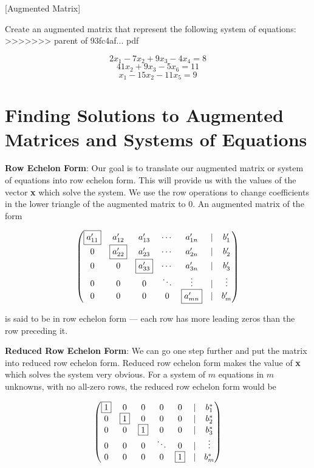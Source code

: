 \documentclass[]{book}
\theoremstyle{definition}
\theoremstyle{definition}
\theoremstyle{definition}
\theoremstyle{remark}
\begin{document}
[Augmented Matrix]
\protect\hypertarget{exr:augmatrix}{}{\label{exr:augmatrix} {} }

Create an augmented matrix that represent the following system of equations:
>>>>>>> parent of 93fc4af... pdf

\[2x_1 -7x_2 + 9x_3 -4x_4 = 8\]
\[41x_2 + 9x_3 -5x_6 = 11\]
\[x_1 -15x_2 -11x_5 = 9\]

\hypertarget{finding-solutions-to-augmented-matrices-and-systems-of-equations}{%
\section{Finding Solutions to Augmented Matrices and Systems of Equations}\label{finding-solutions-to-augmented-matrices-and-systems-of-equations}}

\textbf{Row Echelon Form}: Our goal is to translate our augmented matrix or system of equations into row echelon form. This will provide us with the values of the vector \textbf{x} which solve the system. We use the row operations to change coefficients in the lower triangle of the augmented matrix to 0. An augmented matrix of the form

\[\begin{pmatrix}
            \fbox{$a'_{11}$}& a'_{12} & a'_{13}& \cdots & a'_{1n} & | & b'_1\\
            0 & \fbox{$a'_{22}$} & a'_{23}& \cdots & a'_{2n} & | & b'_2\\
            0 & 0 & \fbox{$a'_{33}$}& \cdots & a'_{3n} & | & b'_3\\
            0 & 0 &0 & \ddots & \vdots  & | & \vdots \\
            0 & 0 &0 &0 & \fbox{$a'_{mn}$} & | & b'_m
            \end{pmatrix}\]

is said to be in row echelon form --- each row has more leading zeros than the row preceding it.

\textbf{Reduced Row Echelon Form}: We can go one step further and put the matrix into reduced row echelon form. Reduced row echelon form makes the value of \textbf{x} which solves the system very obvious. For a system of \(m\) equations in \(m\) unknowns, with no all-zero rows, the reduced row echelon form would be

\[\begin{pmatrix}
            \fbox{$1$}  &  0 &   0 &    0  &   0 & | & b^*_1\\
            0  &  \fbox{$1$} &   0 &    0  &   0 & | & b^*_2\\
            0  &  0 &   \fbox{$1$} &    0  &   0 & | & b^*_3\\
            0  &  0 &   0 &\ddots &   0 & | &\vdots\\
            0  &  0 &   0 &    0  &   \fbox{$1$} & | & b^*_m
            \end{pmatrix}\]
\end{document}
